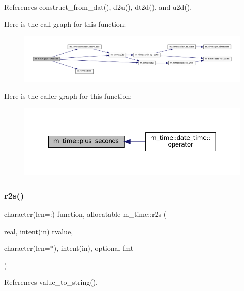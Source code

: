 References construct\+\_\+from\+\_\+dat(), d2u(), dt2d(), and u2d().

Here is the call graph for this function\+:\nopagebreak
\begin{figure}[H]
\begin{center}
\leavevmode
\includegraphics[width=350pt]{namespacem__time_a76e79ee87552ce537cbb674a21b05b5c_cgraph}
\end{center}
\end{figure}
Here is the caller graph for this function\+:\nopagebreak
\begin{figure}[H]
\begin{center}
\leavevmode
\includegraphics[width=350pt]{namespacem__time_a76e79ee87552ce537cbb674a21b05b5c_icgraph}
\end{center}
\end{figure}
\mbox{\label{namespacem__time_a6fdd4bf34977b7a390ce93c75c2cc6d8}} 
\subsubsection{\texorpdfstring{r2s()}{r2s()}}
{\footnotesize\ttfamily character(len=\+:) function, allocatable m\+\_\+time\+::r2s (\begin{DoxyParamCaption}\item[{real, intent(in)}]{rvalue,  }\item[{character(len=$\ast$), intent(in), optional}]{fmt }\end{DoxyParamCaption})\hspace{0.3cm}{\ttfamily [private]}}



References value\+\_\+to\+\_\+string().

